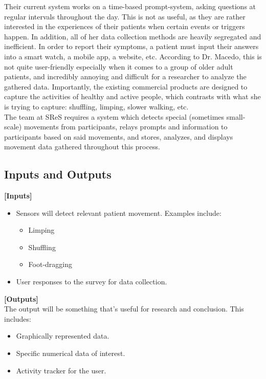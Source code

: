\documentclass[12pt]{article}
\begin{document}
Their current system works on a time-based prompt-system, asking questions at regular intervals throughout the day. This is not as useful, as they are rather interested in the experiences of their patients when certain events or triggers happen. In addition, all of her data collection methods are heavily segregated and inefficient. In order to report their symptoms, a patient must input their answers into a smart watch, a mobile app, a website, etc. According to Dr. Macedo, this is not quite user-friendly especially when it comes to a group of older adult patients, and incredibly annoying and difficult for a researcher to analyze the gathered data. Importantly, the existing commercial products are designed to capture the activities of healthy and active people, which contrasts with what she is trying to capture: shuffling, limping, slower walking, etc.\\

The team at SReS requires a system which detects special (sometimes small-scale) movements from participants, relays prompts and information to participants based on said movements, and stores, analyzes, and displays movement data gathered throughout this process.\\


\pagebreak

\subsection{Inputs and Outputs}

\textbf{[Inputs]}
\begin{itemize}
    \item Sensors will detect relevant patient movement. Examples include:
	\begin{itemize}
		\item Limping
		\item Shuffling
		\item Foot-dragging
	\end{itemize}
    \item User responses to the survey for data collection.
\end{itemize}

\textbf{[Outputs]} \\
\linebreak
The output will be something that's useful for research and conclusion. This includes:
\begin{itemize}
    \item Graphically represented data.
    \item Specific numerical data of interest.
    \item Activity tracker for the user.
\end{itemize}
\end{document}
